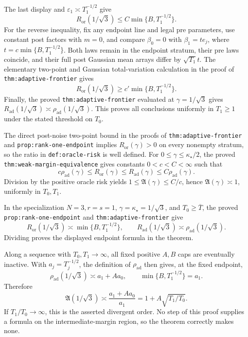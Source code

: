 The last display and \(\varepsilon_1\asymp T_1^{-1/2}\) give
\[
 R_{\mathrm{or}}(1/\sqrt3)\le C\min\{B,T_1^{-1/2}\}.
\]
For the reverse inequality, fix any endpoint line and legal pre parameters, use constant post factors with \(m=0\), and compare \(\beta_0=0\) with \(\beta_1=t e_j\), where \(t=c\min\{B,T_1^{-1/2}\}\).  Both laws remain in the endpoint stratum, their pre laws coincide, and their full post Gaussian mean arrays differ by \(\sqrt{T_1}t\).  The elementary two-point and Gaussian total-variation calculation in the proof of \texttt{thm:adaptive-frontier} gives
\[
 R_{\mathrm{or}}(1/\sqrt3)\ge c'\min\{B,T_1^{-1/2}\}.
\]
Finally, the proved \texttt{thm:adaptive-frontier} evaluated at \(\gamma=1/\sqrt3\) gives \(R_{\mathrm{ad}}(1/\sqrt3)\asymp\rho_{\mathrm{ad}}(1/\sqrt3)\).  This proves all conclusions uniformly in \(T_1\ge1\) under the stated threshold on \(T_0\).

The direct post-noise two-point bound in the proofs of \texttt{thm:adaptive-frontier} and \texttt{prop:rank-one-endpoint} implies \(R_{\mathrm{or}}(\gamma)>0\) on every nonempty stratum, so the ratio in \texttt{def:oracle-risk} is well defined.  For \(0\le\gamma\le\kappa_\star/2\), the proved \texttt{thm:weak-margin-equivalence} gives constants \(0<c<C<\infty\) such that
\[
 c\rho_{\mathrm{ad}}(\gamma)\le R_{\mathrm{or}}(\gamma)
 \le R_{\mathrm{ad}}(\gamma)\le C\rho_{\mathrm{ad}}(\gamma).
\]
Division by the positive oracle risk yields \(1\le\mathfrak A(\gamma)\le C/c\), hence \(\mathfrak A(\gamma)\asymp1\), uniformly in \(T_0,T_1\).

In the specialization \(N=3,r=s=1\), \(\gamma=\kappa_\star=1/\sqrt3\), and \(T_0\ge\overline T\), the proved \texttt{prop:rank-one-endpoint} and \texttt{thm:adaptive-frontier} give
\[
 R_{\mathrm{or}}(1/\sqrt3)\asymp\min\{B,T_1^{-1/2}\},
 \qquad
 R_{\mathrm{ad}}(1/\sqrt3)\asymp\rho_{\mathrm{ad}}(1/\sqrt3).
\]
Dividing proves the displayed endpoint formula in the theorem.

Along a sequence with \(T_0,T_1\to\infty\), all fixed positive \(A,B\) caps are eventually inactive.  With \(a_j=T_j^{-1/2}\), the definition of \(\rho_{\mathrm{ad}}\) then gives, at the fixed endpoint,
\[
 \rho_{\mathrm{ad}}(1/\sqrt3)
 \asymp a_1+A a_0,
 \qquad
 \min\{B,T_1^{-1/2}\}=a_1.
\]
Therefore
\[
 \mathfrak A(1/\sqrt3)
 \asymp\frac{a_1+Aa_0}{a_1}
 =1+A\sqrt{T_1/T_0}.
\]
If \(T_1/T_0\to\infty\), this is the asserted divergent order.  No step of this proof supplies a formula on the intermediate-margin region, so the theorem correctly makes none.

